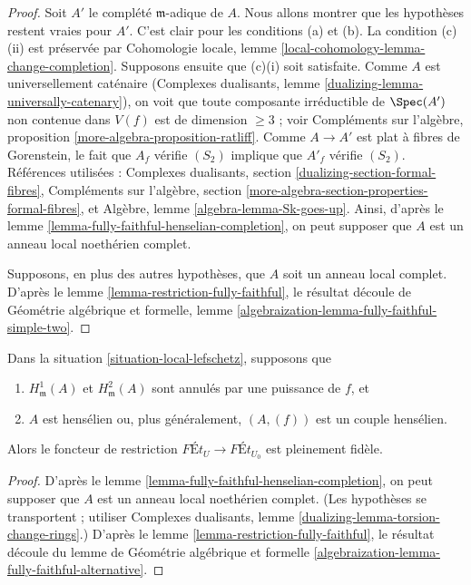 \begin{proof}
Soit $A'$ le complété $\mathfrak m$-adique de $A$. Nous allons montrer que
les hypothèses restent vraies pour $A'$. C'est clair pour les conditions
(a) et (b). La condition (c)(ii) est préservée par
Cohomologie locale, lemme \ref{local-cohomology-lemma-change-completion}.
Supposons ensuite que (c)(i) soit satisfaite. Comme $A$ est universellement caténaire
(Complexes dualisants, lemme \ref{dualizing-lemma-universally-catenary}),
on voit que toute composante irréductible de $\Spec(A')$ non contenue dans $V(f)$
est de dimension $\geq 3$ ; voir
Compléments sur l'algèbre, proposition \ref{more-algebra-proposition-ratliff}.
Comme $A \to A'$ est plat à fibres de Gorenstein,
le fait que $A_f$ vérifie $(S_2)$ implique que $A'_f$ vérifie $(S_2)$.
Références utilisées :
Complexes dualisants, section \ref{dualizing-section-formal-fibres},
Compléments sur l'algèbre, section \ref{more-algebra-section-properties-formal-fibres},
et Algèbre, lemme \ref{algebra-lemma-Sk-goes-up}.
Ainsi, d'après le lemme \ref{lemma-fully-faithful-henselian-completion},
on peut supposer que $A$ est un anneau local noethérien complet.

\medskip\noindent
Supposons, en plus des autres hypothèses, que $A$ soit un anneau local complet.
D'après le lemme \ref{lemma-restriction-fully-faithful}, le résultat découle de
Géométrie algébrique et formelle, lemme
\ref{algebraization-lemma-fully-faithful-simple-two}.
\end{proof}

\begin{lemma}
\label{lemma-fully-faithful-minimal}
\begin{reference}
\cite[Corollary 1.11]{Bhatt-local}
\end{reference}
Dans la situation \ref{situation-local-lefschetz}, supposons que
\begin{enumerate}
\item $H^1_\mathfrak m(A)$ et $H^2_\mathfrak m(A)$ sont
annulés par une puissance de $f$, et
\item $A$ est hensélien ou, plus généralement, $(A, (f))$ est un couple hensélien.
\end{enumerate}
Alors le foncteur de restriction
$\textit{F\'Et}_U \longrightarrow \textit{F\'Et}_{U_0}$
est pleinement fidèle.
\end{lemma}

\begin{proof}
D'après le lemme \ref{lemma-fully-faithful-henselian-completion},
on peut supposer que $A$ est un anneau local noethérien complet.
(Les hypothèses se transportent ; utiliser
Complexes dualisants, lemme \ref{dualizing-lemma-torsion-change-rings}.)
D'après le lemme \ref{lemma-restriction-fully-faithful},
le résultat découle du
lemme de Géométrie algébrique et formelle
\ref{algebraization-lemma-fully-faithful-alternative}.
\end{proof}

